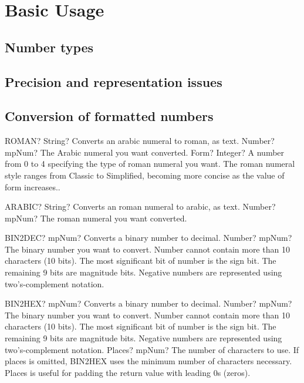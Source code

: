\documentclass[12pt,a4paper,openany]{book}
\begin{document}
\chapter{Basic Usage}

\section{Number types}

\section{Precision and representation issues}

\section{Conversion of formatted numbers}

\begin{mpFunctionsExtract}
\mpWorksheetFunctionTwoNotImplemented
{ROMAN? String? Converts an arabic numeral to roman, as text.}
{Number? mpNum? The Arabic numeral you want converted.}
{Form? Integer? A number from 0 to 4 specifying the type of roman numeral you want. The roman numeral style ranges from Classic to Simplified, becoming more concise as the value of form increases..}
\end{mpFunctionsExtract}

\begin{mpFunctionsExtract}
\mpWorksheetFunctionOneNotImplemented
{ARABIC? String? Converts an roman numeral to arabic, as text.}
{Number? mpNum? The roman numeral you want converted.}
\end{mpFunctionsExtract}

\begin{mpFunctionsExtract}
\mpWorksheetFunctionOneNotImplemented
{BIN2DEC? mpNum? Converts a binary number to decimal.}
{Number? mpNum? The binary number you want to convert. Number cannot contain more than 10 characters (10 bits). The most significant bit of number is the sign bit. The remaining 9 bits are magnitude bits. Negative numbers are represented using two's-complement notation.}
\end{mpFunctionsExtract}

\begin{mpFunctionsExtract}
\mpWorksheetFunctionTwoNotImplemented
{BIN2HEX? mpNum? Converts a binary number to decimal.}
{Number? mpNum? The binary number you want to convert. Number cannot contain more than 10 characters (10 bits). The most significant bit of number is the sign bit. The remaining 9 bits are magnitude bits. Negative numbers are represented using two's-complement notation.}
{Places? mpNum? The number of characters to use. If places is omitted, BIN2HEX uses the minimum number of characters necessary. Places is useful for padding the return value with leading 0s (zeros).}
\end{mpFunctionsExtract}
\end{document}
